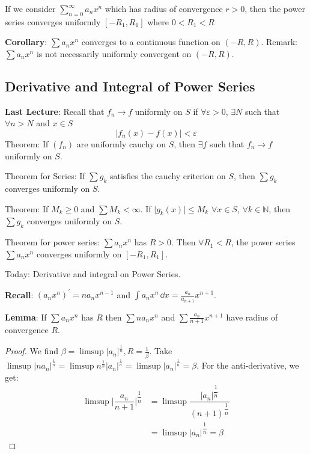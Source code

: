 \documentclass{report}
\begin{document}
\begin{theorem}{26.1}
    If we consider $\sum_{n = 0}^{\infty} a_{n}x^{n}$ which has radius of convergence $r > 0$, then the power series converges uniformly $[-R_{1}, R_{1}]$ where $0 <R_{1} < R$
\end{theorem}

\textbf{Corollary}: $\sum a_{n}x^{n}$ converges to a continuous function on $(-R, R)$. Remark: $\sum a_{n}x^{n}$ is not necessarily uniformly convergent on $(-R, R)$.

\begin{topic}
    \section{Derivative and Integral of Power Series}
\end{topic}

\textbf{Last Lecture}: Recall that $f_{n} \rightarrow f$ uniformly on $S$ if $\forall \varepsilon> 0$, $\exists N$ such that $\forall n > N$ and $x \in S$
    \begin{equation*}
        \lvert f_{n}(x) - f(x) \rvert < \varepsilon
    \end{equation*}
Theorem: If $(f_{n})$ are uniformly cauchy on $S$, then $\exists f$ such that $f_{n} \rightarrow f$ uniformly on $S$. 

Theorem for Series: If $\sum g_{k}$ satisfies the cauchy criterion on $S$, then $\sum g_{k}$ converges uniformly on $S$.

Theorem: If $M_{k} \geq 0$ and $\sum M_{k} < \infty$. If $\lvert g_{k}(x) \rvert \leq M_{k}$ $\forall x \in S$, $\forall k \in \mathbb{N}$, then $\sum g_{k}$ converges uniformly on $S$.

Theorem for power series: $\sum a_{n}x^{n}$ has $R> 0$. Then $\forall R_{1} < R$, the power series $\sum a_{n}x^{n}$ converges uniformly on $[-R_{1}, R_{1}]$.

Today: Derivative and integral on Power Series.

\textbf{Recall}: $(a_{n}x^{n})^{\prime} = na_{n}x^{n - 1}$ and $\int a_{n}x^{n} \, \dd{x}  = \frac{a_{n}}{a_{n + 1}}x^{n + 1}$. 

\textbf{Lemma}: If $\sum a_{n}x^{n}$ has $R$ then $\sum na_{n}x^{n}$ and $\sum\frac{a_{n}}{n + 1}x^{n + 1}$ have radius of convergence $R$.
    \begin{proof}
        We find $\beta = \limsup \lvert a_{n} \rvert^{\frac{1}{n}}, R = \frac{1}{\beta}$. Take $\limsup \lvert na_{n} \rvert^{\frac{1}{n}} = \limsup n^{\frac{1}{n}}\lvert a_{n} \rvert^{\frac{1}{n}} = \limsup \lvert a_{n} \rvert^{\frac{1}{n}} = \beta$. For the anti-derivative, we get:
            \begin{align*}
                \limsup \lvert \dfrac{a_{n}}{n + 1} \rvert^{\dfrac{1}{n}} &= \limsup \dfrac{\lvert a_{n} \rvert^{\dfrac{1}{n}}}{(n + 1)^{\dfrac{1}{n}}} \\
                                                                          &= \limsup \lvert a_{n} \rvert^{\dfrac{1}{n}} = \beta                           
            \end{align*}
    \end{proof}
\end{document}

